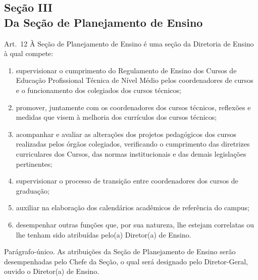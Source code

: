 \documentclass[a4paper,12pt]{report}
\begin{document}
\subsection{Seção III \\ Da Seção de Planejamento de Ensino}

Art.~12 À Seção de Planejamento de Ensino é uma seção da Diretoria de Ensino à qual compete:

\begin{enumerate}
\renewcommand{\labelenumi}{\Roman{enumi}}

\item supervisionar o cumprimento do Regulamento de Ensino dos Cursos de Educação 
      Profissional Técnica de Nível Médio pelos coordenadores de cursos e o funcionamento 
      dos colegiados dos cursos técnicos;

\item promover, juntamente com os coordenadores dos cursos técnicos, reflexões e medidas
      que visem à melhoria dos currículos dos cursos técnicos;
      
\item acompanhar e avaliar as alterações dos projetos pedagógicos dos cursos realizadas 
      pelos órgãos colegiados, verificando o cumprimento das diretrizes curriculares dos 
      Cursos, das normas institucionais e das demais legislações pertinentes;
        
\item supervisionar o processo de transição entre coordenadores dos cursos de graduação;

\item auxiliar na elaboração dos calendários acadêmicos de referência do campus;

\item desempenhar outras funções que, por sua natureza, lhe estejam correlatas ou lhe 
      tenham sido atribuídas pelo(a) Diretor(a) de Ensino.
\end{enumerate}

Parágrafo-único. As atribuições da Seção de Planejamento de Ensino serão 
desempenhadas pelo Chefe da Seção, o qual será designado pelo Diretor-Geral, ouvido 
o Diretor(a) de Ensino.

\end{document}
